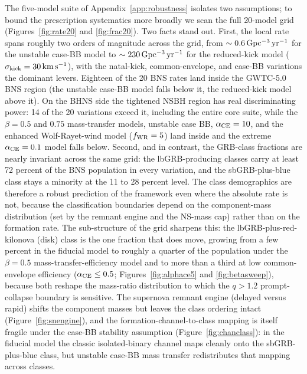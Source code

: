 \documentclass[twocolumn,amsmath]{aastex702}
\newcommand{\Gpcyr}{{\rm Gpc^{-3}\,yr^{-1}}}
\begin{document}
The five-model suite of Appendix~\ref{app:robustness} isolates two assumptions; to
bound the prescription systematics more broadly we scan the full 20-model
\citet{broekgaarden2021} grid (Figures~\ref{fig:rate20} and \ref{fig:frac20}).
Two facts stand out. First, the local rate spans roughly two orders of magnitude
across the grid, from $\sim 0.6\,\Gpcyr$ for the unstable case-BB model to
$\sim 230\,\Gpcyr$ for the reduced-kick model
($\sigma_{\rm kick} = 30\,{\rm km\,s^{-1}}$), with the natal-kick,
common-envelope, and case-BB variations the dominant levers. Eighteen of the
20 BNS rates land inside the GWTC-5.0 BNS region (the unstable case-BB model
falls below it, the reduced-kick model above it). On the BHNS side the
tightened NSBH region has real discriminating power: 14 of the 20 variations
exceed it, including the entire core suite, while the $\beta = 0.5$ and
$0.75$ mass-transfer models, unstable case BB, $\alpha_{\rm CE} = 10$, and
the enhanced Wolf-Rayet-wind model ($f_{\rm WR} = 5$) land inside and the
extreme $\alpha_{\rm CE} = 0.1$ model falls below. Second, and in contrast, the GRB-class fractions are nearly
invariant across the same grid: the lbGRB-producing classes carry at least 72
percent of the BNS population in every variation, and the sbGRB-plus-blue class
stays a minority at the 11 to 28 percent level. The class demographics are therefore a robust
prediction of the framework even where the absolute rate is not, because the
classification boundaries depend on the component-mass distribution (set by the
remnant engine and the NS-mass cap) rather than on the formation rate. The
sub-structure of the grid sharpens this: the lbGRB-plus-red-kilonova (disk) class
is the one fraction that does move, growing from a few percent in the fiducial
model to roughly a quarter of the population under the $\beta = 0.5$
mass-transfer-efficiency model and to more than a third at low common-envelope
efficiency ($\alpha_{\rm CE} \leq 0.5$;
Figures~\ref{fig:alphace5} and \ref{fig:betasweep}), because both reshape the
mass-ratio distribution to which the $q > 1.2$ prompt-collapse boundary is
sensitive. The supernova remnant engine (delayed versus rapid) shifts the
component masses but leaves the class ordering intact
(Figure~\ref{fig:snengine}), and the formation-channel-to-class mapping is itself
fragile under the case-BB stability assumption (Figure~\ref{fig:chanclass}): in
the fiducial model the classic isolated-binary channel maps cleanly onto the
sbGRB-plus-blue class, but unstable case-BB mass transfer redistributes that
mapping across classes.
\end{document}
